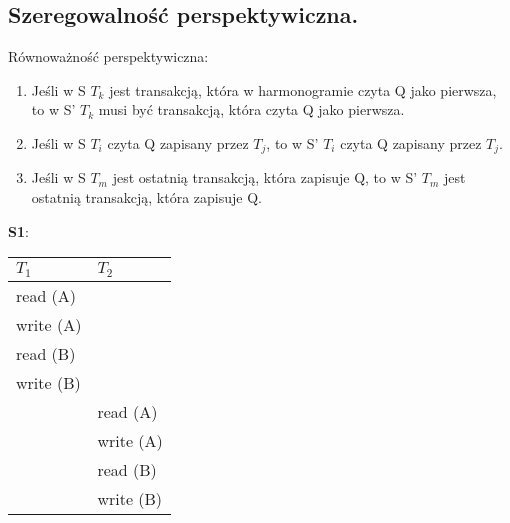 \documentclass[main.tex]{subfiles}
\begin{document}
    \subsection{Szeregowalność perspektywiczna.}
    Równoważność perspektywiczna:
    \begin{enumerate}[label=(\Alph*)]
        \item Jeśli w S $T_k$ jest transakcją, która w
        harmonogramie czyta Q jako pierwsza, to w S' $T_k$ musi być transakcją, która czyta Q jako pierwsza.
        \item Jeśli w S $T_i$ czyta Q zapisany przez $T_j$, to w S' $T_i$ czyta Q zapisany przez $T_j$.
        \item Jeśli w S  $T_m$ jest ostatnią transakcją, która
        zapisuje Q, to w S' $T_m$ jest ostatnią transakcją, która zapisuje Q.
    \end{enumerate}

    \noindent \textbf{S1}:
    \begin{table}[H]
        \begin{center}
            \begin{tabular}{| p{6cm} | p{6cm} |}
                \hline
                $T_1$ & $T_2$\\
                \hline
                \hline
                read (A) &\\
                \hline
                write (A) &\\
                \hline
                read (B)&\\
                \hline
                write (B)&\\
                \hline
                & read (A)\\
                \hline
                & write (A)\\
                \hline
                & read (B)\\
                \hline
                & write (B)\\
                \hline
            \end{tabular}
        \end{center}
    \end{table}
\end{document}
